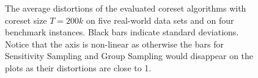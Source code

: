 \begin{figure}
{  }
  \newline \newline
  \newline \newline
  \caption{The average distortions of the evaluated coreset algorithms with coreset size $T=200k$ on five real-world data sets and on four benchmark instances. Black bars indicate standard deviations. Notice that the axis is non-linear as otherwise the bars for Sensitivity Sampling and Group Sampling would disappear on the plots as their distortions are close to 1.}
  \label{fig:distortions}
\end{figure}








